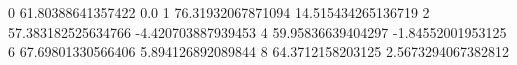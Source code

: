 0 61.80388641357422 0.0
1 76.31932067871094 14.515434265136719
2 57.383182525634766 -4.420703887939453
4 59.95836639404297 -1.84552001953125
6 67.69801330566406 5.894126892089844
8 64.3712158203125 2.5673294067382812
